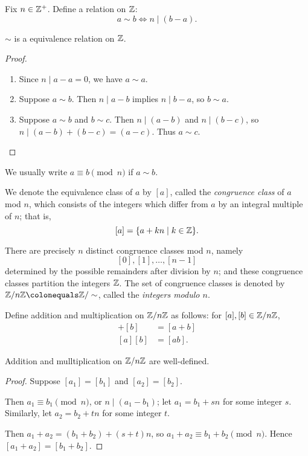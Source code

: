 \begin{example}
Fix $n\in\mathbb Z^+$. Define a relation on $\mathbb Z$:
\[a\sim b\iff n\mid(b-a).\]
\begin{lemma*}
$\sim$ is a equivalence relation on $\mathbb Z$.
\end{lemma*}
\begin{proof} \
\begin{enumerate}[label=(\roman*)]
\item Since $n\mid a-a=0$, we have $a\sim a$.
\item Suppose $a\sim b$. Then $n\mid a-b$ implies $n\mid b-a$, so $b\sim a$.
\item Suppose $a\sim b$ and $b\sim c$. Then $n\mid(a-b)$ and $n\mid(b-c)$, so $n\mid(a-b)+(b-c)=(a-c)$. Thus $a\sim c$.
\end{enumerate}
\end{proof}

We usually write $a\equiv b\pmod n$ if $a\sim b$.

We denote the equivalence class of $a$ by $[a]$, called the \emph{congruence class} of $a$ mod $n$, which consists of the integers which differ from $a$ by an integral multiple of $n$; that is,
\[[a]=\{a+kn\mid k\in\mathbb Z\}.\]

There are precisely $n$ distinct congruence classes mod $n$, namely
\[[0],[1],\dots,[n-1]\]
determined by the possible remainders after division by $n$; and these congruence classes partition the integers $\mathbb Z$. The set of congruence classes is denoted by $\ZZ/n\ZZ\colonequals\ZZ/\sim$, called the \emph{integers modulo $n$}.

Define addition and multiplication on $\mathbb Z/n\mathbb Z$ as follows: for $[a],[b]\in\mathbb Z/n\mathbb Z$,
\begin{align*}
[a]+[b]&=[a+b]\\
[a][b]&=[ab].
\end{align*}

\begin{lemma*}
Addition and mulltiplication on $\mathbb Z/n\mathbb Z$ are well-defined.
\end{lemma*}

\begin{proof}
Suppose $[a_1]=[b_1]$ and $[a_2]=[b_2]$.

Then $a_1\equiv b_1\pmod n$, or $n\mid(a_1-b_1)$; let $a_1=b_1+sn$ for some integer $s$. Similarly, let $a_2=b_2+tn$ for some integer $t$.

Then $a_1+a_2=(b_1+b_2)+(s+t)n$, so $a_1+a_2\equiv b_1+b_2\pmod n$. Hence $[a_1+a_2]=[b_1+b_2]$.


\end{proof}
\end{example}
